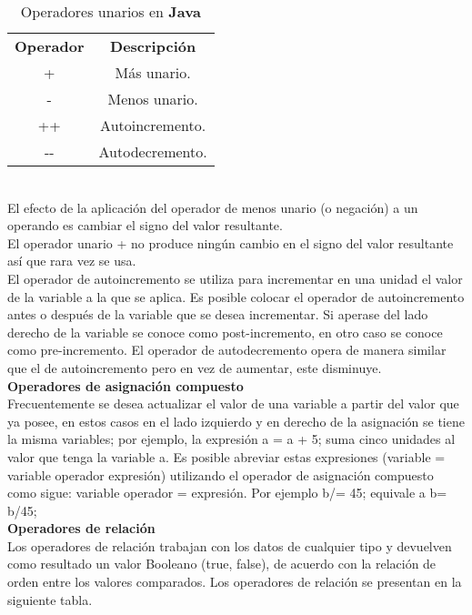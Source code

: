 \documentclass[12pt, A4]{article}
\begin{document}
{{{		\begin{table}[h!]
			\vspace{-0.3cm}
		\centering
		\begin{tabular}{c | c}
			\textbf{Operador} & \textbf{Descripción} \\
			+ & Más unario.\\
			- & Menos unario.\\
			++ & Autoincremento.\\
			-\hspace{0.1cm}- & Autodecremento.\\  \hline
		\end{tabular}
		\caption{Operadores unarios en \textbf{Java}}
	\end{table}
 \\El efecto de la aplicación del operador de menos unario (o negación) a un operando es cambiar el signo del valor resultante.\\El operador unario + no produce ningún cambio en el signo del valor resultante así que rara vez se usa.\\
El operador de autoincremento se utiliza para incrementar en una unidad el valor de la variable a la que se aplica. Es posible colocar el operador de autoincremento antes o después de la variable que se desea incrementar. Si aperase del lado derecho de la variable se conoce como post-incremento, en otro caso se conoce como   pre-incremento. El operador de autodecremento opera de manera similar que el de autoincremento pero en vez de aumentar, este disminuye.	\\
\textbf{{{\Large } Operadores de asignación compuesto }}\\ Frecuentemente se desea actualizar el valor de una variable a partir del valor que ya posee, en estos casos en el lado izquierdo y en derecho de la asignación se tiene la misma variables; por ejemplo, la expresión a = a + 5; suma cinco unidades al valor que tenga la variable a. Es posible abreviar estas expresiones (variable = variable operador expresión) utilizando el operador de asignación compuesto como sigue: variable operador = expresión. Por ejemplo b/= 45; equivale a b= b/45; \\
\textbf{{{\Large } Operadores de relación}}\\ Los operadores de relación trabajan con los datos de cualquier tipo y devuelven como resultado un valor Booleano (true, false), de acuerdo con la relación de orden entre los valores comparados. Los operadores de relación se presentan en la siguiente tabla.




}}}
\end{document}
